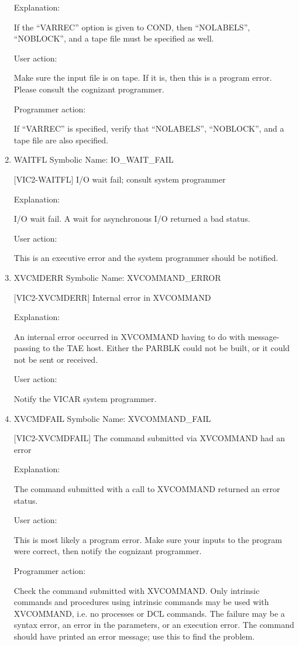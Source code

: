 \begin{enumerate}
Explanation:

If the ``VARREC'' option is given to COND, then ``NOLABELS'',
``NOBLOCK'', and a tape file must be specified as well.

User action:

Make sure the input file is on tape.  If it is, then this is
a program error.  Please consult the cognizant programmer.

Programmer action:

If ``VARREC'' is specified, verify that ``NOLABELS'',
``NOBLOCK'', and a tape file are also specified.


\item WAITFL Symbolic Name: IO\_WAIT\_FAIL

[VIC2-WAITFL] I/O wait fail; consult system programmer

Explanation:

I/O wait fail.  A wait for asynchronous I/O returned a bad status.

User action:

This is an executive error and the system programmer
should be notified.


\item XVCMDERR Symbolic Name: XVCOMMAND\_ERROR

[VIC2-XVCMDERR] Internal error in XVCOMMAND

Explanation:

An internal error occurred in XVCOMMAND having to do with
message-passing to the TAE host.  Either the PARBLK could
not be built, or it could not be sent or received.

User action:

Notify the VICAR system programmer.


\item XVCMDFAIL Symbolic Name: XVCOMMAND\_FAIL

[VIC2-XVCMDFAIL] The command submitted via XVCOMMAND had an error

Explanation:

The command submitted with a call to XVCOMMAND returned
an error status.

User action:

This is most likely a program error.  Make sure your inputs
to the program were correct, then notify the cognizant
programmer.

Programmer action:

Check the command submitted with XVCOMMAND.  Only intrinsic
commands and procedures using intrinsic commands may be
used with XVCOMMAND, i.e. no processes or DCL commands.
The failure may be a syntax error, an error in the
parameters, or an execution error.  The command should
have printed an error message; use this to find the
problem.

\end{enumerate}

